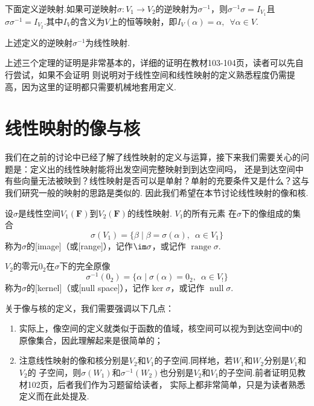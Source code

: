 下面定义逆映射.如果可逆映射$\sigma:V_1 \to V_2$的逆映射为$\sigma^{-1}$，则$\sigma^{-1}\sigma=I_{V_1}$且
$\sigma\sigma^{-1}=I_{V_2}$.其中$I_{V}$的含义为$V$上的恒等映射，即$I_V(\alpha)=\alpha,\enspace \forall \alpha \in V$.
\begin{theorem}
    上述定义的逆映射$\sigma^{-1}$为线性映射.
\end{theorem}

上述三个定理的证明是非常基本的，详细的证明在教材103-104页，读者可以先自行尝试，如果不会证明
则说明对于线性空间和线性映射的定义熟悉程度仍需提高，因为这里的证明都只需要机械地套用定义.

\section{线性映射的像与核}
我们在之前的讨论中已经了解了线性映射的定义与运算，接下来我们需要关心的问题是：定义出的线性映射能将出发空间完整映射到到达空间吗，
还是到达空间中有些向量无法被映到？线性映射是否可以是单射？单射的充要条件又是什么？这与我们研究一般的映射的思路是类似的.
因此我们希望在本节讨论线性映射的像和核.
\begin{definition}
    设$\sigma$是线性空间$V_1(\mathbf{F})$到$V_2(\mathbf{F})$的线性映射. $V_1$的所有元素
    在$\sigma$下的像组成的集合
    \[\sigma(V_1)=\{\beta \mid \beta=\sigma(\alpha),\enspace \alpha \in V_1\}\]
    称为$\sigma$的[image]（或[range]），记作$\im \sigma$，或记作 $\operatorname{range} \sigma$.

    $V_2$的零元$0_2$在$\sigma$下的完全原像
    \[\sigma^{-1}(0_2)=\{\alpha \mid \sigma(\alpha)=0_2,\enspace \alpha \in V_!\}\]
    称为$\sigma$的[kernel]（或[null space]），记作$\ker \sigma$，或记作 $\operatorname{null} \sigma$.
\end{definition}

关于像与核的定义，我们需要强调以下几点：
\begin{enumerate}
    \item 实际上，像空间的定义就类似于函数的值域，核空间可以视为到达空间中0的原像集合，因此理解起来是很简单的；
    \item 注意线性映射的像和核分别是$V_2$和$V_1$的子空间.同样地，若$W_1$和$W_2$分别是$V_1$和$V_2$的
    子空间，则$\sigma(W_1)$和$\sigma^{-1}(W_2)$也分别是$V_2$和$V_1$的子空间.前者证明见教材102页，后者我们作为习题留给读者，
    实际上都非常简单，只是为读者熟悉定义而在此处提及.
\end{enumerate}


